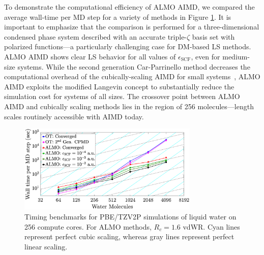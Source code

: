 \documentclass[aps,prl,reprint,amsmath,amssymb]{revtex4-1}
\begin{document}


To demonstrate the computational efficiency of ALMO AIMD, we compared the average wall-time per MD step for a variety of methods in Figure \ref{fig:strongscaling_log}.
It is important to emphasize that the comparison is performed for a three-dimensional condensed phase system described with an accurate triple-$\zeta$ basis set with polarized functions---a particularly challenging case for DM-based LS methods.
ALMO AIMD shows clear LS behavior for all values of $\epsilon_{\text{SCF}}$, even for medium-size systems. While the second generation Car-Parrinello method decreases the computational overhead of the cubically-scaling AIMD for small systems~\cite{a:2ndcpmd}, ALMO AIMD exploits the modified Langevin concept to substantially reduce the simulation cost for systems of all sizes.
The crossover point between ALMO AIMD and cubically scaling methods lies in the region of 256 molecules---length scales routinely accessible with AIMD today. 


\begin{figure}
\includegraphics[trim={2.5cm 0.5cm 3.4cm 0.9cm},clip,width=8.6cm]{strongscaling_log.eps}
\caption{\label{fig:strongscaling_log} Timing benchmarks for PBE/TZV2P simulations of liquid water on 256 compute cores. 
For ALMO methods, $R_{c} = 1.6$ vdWR. 
Cyan lines represent perfect cubic scaling, whereas gray lines represent perfect linear scaling. 
}
\end{figure}
\end{document}
